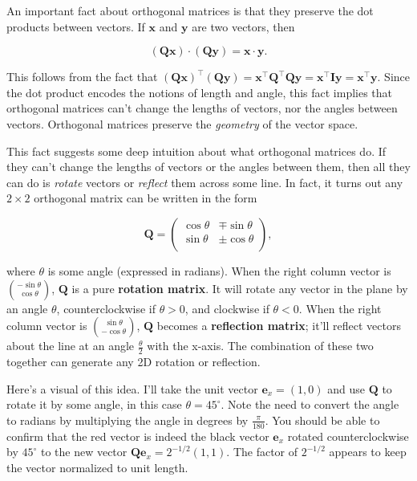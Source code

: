 \documentclass[
  letterpaper,
  DIV=11,
  numbers=noendperiod]{scrreprt}
\begin{document}
An important fact about orthogonal matrices is that they preserve the
dot products between vectors. If \(\mathbf{x}\) and \(\mathbf{y}\) are
two vectors, then

\[(\mathbf{Q} \mathbf{x}) \cdot (\mathbf{Q}\mathbf{y}) = \mathbf{x} \cdot \mathbf{y}.\]

This follows from the fact that
\((\mathbf{Q} \mathbf{x})^\top (\mathbf{Q} \mathbf{y}) = \mathbf{x}^\top \mathbf{Q}^\top\mathbf{Q}\mathbf{y} = \mathbf{x}^\top \mathbf{I} \mathbf{y} = \mathbf{x}^\top \mathbf{y}\).
Since the dot product encodes the notions of length and angle, this fact
implies that orthogonal matrices can't change the lengths of vectors,
nor the angles between vectors. Orthogonal matrices preserve the
\emph{geometry} of the vector space.

This fact suggests some deep intuition about what orthogonal matrices
do. If they can't change the lengths of vectors or the angles between
them, then all they can do is \emph{rotate} vectors or \emph{reflect}
them across some line. In fact, it turns out any \(2 \times 2\)
orthogonal matrix can be written in the form

\[
\mathbf{Q} = 
\begin{pmatrix}
\cos \theta & \mp \sin \theta \\
\sin \theta & \pm \cos \theta \\
\end{pmatrix},
\]

where \(\theta\) is some angle (expressed in radians). When the right
column vector is \(\binom{-\sin\theta}{\cos\theta}\), \(\mathbf{Q}\) is
a pure \textbf{rotation matrix}. It will rotate any vector in the plane
by an angle \(\theta\), counterclockwise if \(\theta > 0\), and
clockwise if \(\theta < 0\). When the right column vector is
\(\binom{\sin\theta}{-\cos\theta}\), \(\mathbf{Q}\) becomes a
\textbf{reflection matrix}; it'll reflect vectors about the line at an
angle \(\frac{\theta}{2}\) with the x-axis. The combination of these two
together can generate any 2D rotation or reflection.

Here's a visual of this idea. I'll take the unit vector
\(\mathbf{e}_x=(1,0)\) and use \(\mathbf{Q}\) to rotate it by some
angle, in this case \(\theta = 45^\circ\). Note the need to convert the
angle to radians by multiplying the angle in degrees by
\(\frac{\pi}{180}\). You should be able to confirm that the red vector
is indeed the black vector \(\mathbf{e}_x\) rotated counterclockwise by
\(45^\circ\) to the new vector
\(\mathbf{Q}\mathbf{e}_x = 2^{-1/2}(1,1)\). The factor of \(2^{-1/2}\)
appears to keep the vector normalized to unit length.
\end{document}
